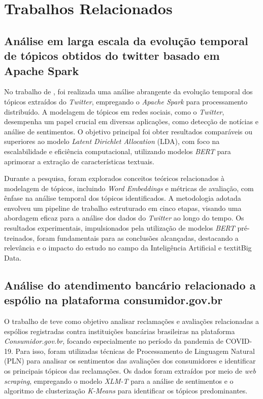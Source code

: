 \chapter{Trabalhos Relacionados}
\label{cap:trabalhos_relacionados}


\section{Análise em larga escala da evolução temporal de tópicos obtidos do twitter basado em Apache Spark}
\label{cap:trabalhos_relacionados:sec:braulio}

No trabalho de , foi realizada uma análise abrangente da evolução temporal dos tópicos extraídos do \textit{Twitter}, empregando o \textit{Apache Spark} para processamento distribuído. A modelagem de tópicos em redes sociais, como o \textit{Twitter}, desempenha um papel crucial em diversas aplicações, como detecção de notícias e análise de sentimentos. O objetivo principal foi obter resultados comparáveis ou superiores ao modelo \textit{Latent Dirichlet Allocation} (LDA), com foco na escalabilidade e eficiência computacional, utilizando modelos \textit{BERT} para aprimorar a extração de características textuais.

Durante a pesquisa, foram explorados conceitos teóricos relacionados à modelagem de tópicos, incluindo \textit{Word Embeddings} e métricas de avaliação, com ênfase na análise temporal dos tópicos identificados. A metodologia adotada envolveu um pipeline de trabalho estruturado em cinco etapas, visando uma abordagem eficaz para a análise dos dados do \textit{Twitter} ao longo do tempo. Os resultados experimentais, impulsionados pela utilização de modelos \textit{BERT} pré-treinados, foram fundamentais para as conclusões alcançadas, destacando a relevância e o impacto do estudo no campo da Inteligência Artificial e textit{Big Data}.


\section{Análise do atendimento bancário relacionado a espólio na plataforma consumidor.gov.br}
\label{cap:trabalhos_relacionados:sec:desterro}

O trabalho de  teve como objetivo analisar reclamações e avaliações relacionadas a espólios registradas contra instituições bancárias brasileiras na plataforma \textit{Consumidor.gov.br}, focando especialmente no período da pandemia de COVID-19. Para isso, foram utilizadas técnicas de Processamento de Linguagem Natural (PLN) para analisar os sentimentos das avaliações dos consumidores e identificar os principais tópicos das reclamações. Os dados foram extraídos por meio de \textit{web scraping}, empregando o modelo \textit{XLM-T} para a análise de sentimentos e o algoritmo de clusterização \textit{K-Means} para identificar os tópicos predominantes.

